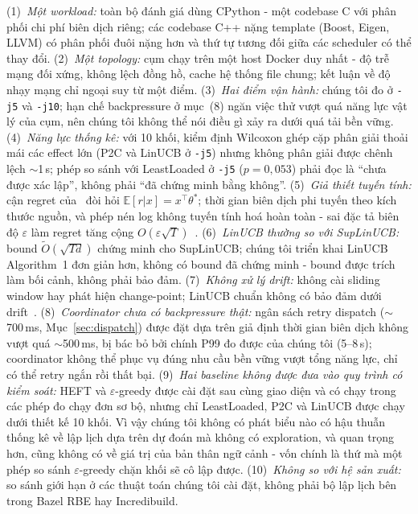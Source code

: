 \documentclass[final,5p,times,twocolumn]{elsarticle}
\begin{document}
(1)~\emph{Một workload:} toàn bộ đánh giá dùng CPython - một codebase C với phân phối chi phí biên dịch riêng; các codebase C++ nặng template (Boost, Eigen, LLVM) có phân phối đuôi nặng hơn và thứ tự tương đối giữa các scheduler có thể thay đổi. (2)~\emph{Một topology:} cụm chạy trên một host Docker duy nhất - độ trễ mạng đối xứng, không lệch đồng hồ, cache hệ thống file chung; kết luận về độ nhạy mạng chỉ ngoại suy từ một điểm. (3)~\emph{Hai điểm vận hành:} chúng tôi đo ở \texttt{-j5} và \texttt{-j10}; hạn chế backpressure ở mục~(8) ngăn việc thử vượt quá năng lực vật lý của cụm, nên chúng tôi không thể nói điều gì xảy ra dưới quá tải bền vững. (4)~\emph{Năng lực thống kê:} với 10 khối, kiểm định Wilcoxon ghép cặp phân giải thoải mái các effect lớn (P2C và LinUCB ở \texttt{-j5}) nhưng không phân giải được chênh lệch $\sim$1\,s; phép so sánh với LeastLoaded ở \texttt{-j5} ($p=0{,}053$) phải đọc là ``chưa được xác lập'', không phải ``đã chứng minh bằng không''. (5)~\emph{Giả thiết tuyến tính:} cận regret của~\cite{chu2011} đòi hỏi $\mathbb{E}[r|x]=x^\top\theta^*$; thời gian biên dịch phi tuyến theo kích thước nguồn, và phép nén log không tuyến tính hoá hoàn toàn - sai đặc tả biên độ $\varepsilon$ làm regret tăng cộng $O(\varepsilon\sqrt{T})$~\cite{lattimore2020}. (6)~\emph{LinUCB thường so với SupLinUCB:} bound $\tilde{O}(\sqrt{Td})$ chứng minh cho SupLinUCB; chúng tôi triển khai LinUCB Algorithm~1 đơn giản hơn, không có bound đã chứng minh - bound được trích làm bối cảnh, không phải bảo đảm. (7)~\emph{Không xử lý drift:} không cài sliding window hay phát hiện change-point; LinUCB chuẩn không có bảo đảm dưới drift~\cite{lattimore2020}. (8)~\emph{Coordinator chưa có backpressure thật:} ngân sách retry dispatch ($\sim$700\,ms, Mục~\ref{sec:dispatch}) được đặt dựa trên giả định thời gian biên dịch không vượt quá $\sim$500\,ms, bị bác bỏ bởi chính P99 đo được của chúng tôi (5--8\,s); coordinator không thể phục vụ đúng nhu cầu bền vững vượt tổng năng lực, chỉ có thể retry ngắn rồi thất bại. (9)~\emph{Hai baseline không được đưa vào quy trình có kiểm soát:} HEFT và $\varepsilon$-greedy được cài đặt sau cùng giao diện và có chạy trong các phép đo chạy đơn sơ bộ, nhưng chỉ LeastLoaded, P2C và LinUCB được chạy dưới thiết kế 10 khối. Vì vậy chúng tôi không có phát biểu nào có hậu thuẫn thống kê về lập lịch dựa trên dự đoán mà không có exploration, và quan trọng hơn, cũng không có về giá trị của bản thân ngữ cảnh - vốn chính là thứ mà một phép so sánh $\varepsilon$-greedy chặn khối sẽ cô lập được. (10)~\emph{Không so với hệ sản xuất:} so sánh giới hạn ở các thuật toán chúng tôi cài đặt, không phải bộ lập lịch bên trong Bazel RBE hay Incredibuild.
\end{document}
